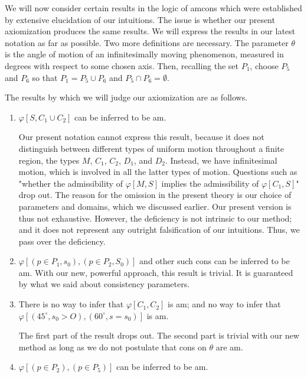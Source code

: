 \documentclass[10pt,twoside,draft]{memoir}
\newcommand{\greater}{>}
\begin{document}
{{{{We will now consider certain results in the logic of amcons which were 
established by extensive elucidation of our intuitions. The issue is whether 
our present axiomization produces the same results. We will express the 
results in our latest notation as far as possible. Two more definitions are 
necessary. The parameter $\theta$ is the angle of motion of an infinitesimally 
moving phenomenon, measured in degrees with respect to some chosen axis. 
Then, recalling the set $P_1$, choose $P_5$ and $P_6$ so that $P_1=P_5\cup P_6$ and 
$P_5\cap P_6=\emptyset$. 

The results by which we will judge our axiomization are as follows. 

\begin{enumerate} %

	\item $\varphi[S, C_1\cup C_2]$ can be inferred to be am. 

Our present notation cannot express this result, because it does not 
distinguish between different types of uniform motion throughout a finite 
region, \ie the types $M$, $C_1$, $C_2$, $D_1$, and $D_2$. Instead, we have infinitesimal 
motion, which is involved in all the latter types of motion. Questions such as 
"whether the admissibility of $\varphi[M,S]$ implies the admissibility of $\varphi[C_1,S]$" 
drop out. The reason for the omission in the present theory is our choice of 
parameters and domains, which we discussed earlier. Our present version is 
thus not exhaustive. However, the deficiency is not intrinsic to our method; 
and it does not represent any outright falsification of our intuitions. Thus, 
we pass over the deficiency. 

\item $\varphi[(p\in P_1,s_0),(p\in P_2,S_0)]$ and other such cons can be inferred to be am. 
With our new, powerful approach, this result is trivial. It is guaranteed by 
what we said about consistency parameters. 

\item There is no way to infer that $\varphi[C_1,C_2]$ is am; and no way to infer that 
$\varphi[(45^\circ,s_0\greater O),(60^\circ,s=s_0)]$ is am. 

The first part of the result drops out. The second part is trivial with our new 
method as long as we do not postulate that cons on $\theta$ are am. 

\item $\varphi[(p\in P_2),(p\in P_5)]$ can be inferred to be am. 


\end{enumerate}}}}}
\end{document}

